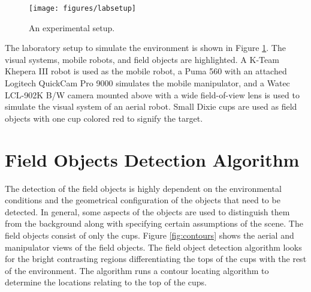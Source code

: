     \begin{figure}%
    \centerline{\texttt{[image: figures/labsetup]}}
       \caption{An experimental setup.}
       \label{fig:labsetup}
    \end{figure}
    The laboratory setup to simulate the environment is shown in Figure
      \ref{fig:labsetup}.
    The visual systems, mobile robots, and field objects are highlighted.
    A K-Team Khepera III robot is used as the mobile robot, a Puma 560
      with an attached Logitech QuickCam Pro 9000 simulates the mobile
      manipulator, and a Watec LCL-902K B/W camera mounted above with
      a wide field-of-view lens is used to simulate the visual system
      of an aerial robot.
    Small Dixie cups are used as field objects with one cup colored red 
      to signify the target.

  \section{Field Objects Detection Algorithm}
    The detection of the field objects is highly dependent on the environmental 
      conditions and the geometrical configuration of the objects that need to 
      be detected.
    In general, some aspects of the objects are used to distinguish them from 
      the background along with specifying certain assumptions of the scene.
    The field objects consist of only the cups. 
    Figure \ref{fig:contours} shows the aerial and manipulator views of the 
      field objects.
    The field object detection algorithm looks for the bright contrasting 
      regions differentiating the tops of the cups with the rest of the 
      environment.
    The algorithm runs a contour locating algorithm to determine the locations 
      relating to the top of the cups.

